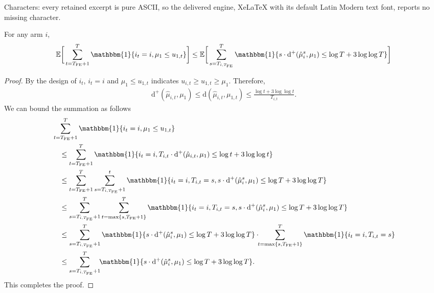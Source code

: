 \documentclass[10pt,a4paper]{amsart}
\newcommand{\Tfe}{T_{\mathrm{FE}}}
\newcommand{\bbE}{\mathbb{E}}
\newcommand{\hatmu}{\hat{\mu}}
\newcommand{\rmd}{\mathrm{d}}
\begin{document}
Characters: every retained excerpt is pure ASCII, so the delivered engine, XeLaTeX with its default Latin Modern text font, reports no missing character.
\begin{lemma}\label{lem:KLUCBH_lem1}
    For any arm $i$,
    \begin{align}
        \bbE\bigg[ \sum_{t=\Tfe+1}^T\mathbbm{1}\{i_t=i,\mu_1\leq u_{1,t}\}\bigg]
        \leq
        \bbE\bigg[ \sum_{s=T_{i,\Tfe}}^T \mathbbm{1}\{s\cdot \rmd^+(\hatmu_i^s,\mu_1)\leq \log T+3 \log\log T\}\bigg]
    \end{align}
\end{lemma}

\begin{proof}
    By the design of $i_t$, $i_t=i$ and $\mu_1\leq u_{1,t}$ indicates $u_{i,t}\geq u_{1,t}\geq\mu_1$. Therefore, 
    \begin{align}
        \rmd^+(\hatmu_{i,t},\mu_1)\leq \rmd(\hatmu_{i,t},\mu_{1,t})\leq \frac{\log t+3 \log\log t}{T_{i,t}}.
    \end{align}
    We can bound the summation as follows
    \begin{align}
        & \sum_{t=\Tfe+1}^T\mathbbm{1}\{i_t=i,\mu_1\leq u_{1,t}\}
        \\
        &\quad\leq
        \sum_{t=\Tfe+1}^T\mathbbm{1}\{i_t=i,T_{i,t}\cdot \rmd^+(\hatmu_{i,t},\mu_1)\leq \log t+3 \log\log t\}
        \\
        &\quad\leq
        \sum_{t=\Tfe+1}^T\sum_{s=T_{i,\Tfe}+1}^t\mathbbm{1}\{i_t=i,T_{i,t}=s,s\cdot \rmd^+(\hatmu_{i}^s,\mu_1)\leq \log T+3 \log\log T\}
        \\
        &\quad\leq
        \sum_{s=T_{i,\Tfe}+1}^T \sum_{t=\max\{s,\Tfe+1\}}^T\mathbbm{1}\{i_t=i,T_{i,t}=s,s\cdot \rmd^+(\hatmu_{i}^s,\mu_1)\leq \log T+3 \log\log T\}
        \\
        &\quad\leq
        \sum_{s=T_{i,\Tfe}+1}^T \mathbbm{1}\{s\cdot \rmd^+(\hatmu_{i}^s,\mu_1)\leq \log T+3 \log\log T\}\cdot \!\!\sum_{t=\max\{s,\Tfe+1\}}^T\mathbbm{1}\{i_t=i,T_{i,t}=s\}
        \\
        &\quad\leq
        \sum_{s=T_{i,\Tfe}+1}^T \!\!\mathbbm{1}\{s\cdot \rmd^+(\hatmu_{i}^s,\mu_1)\leq \log T+3 \log\log T\}.
    \end{align}
    This completes the proof.
\end{proof}
\end{document}
